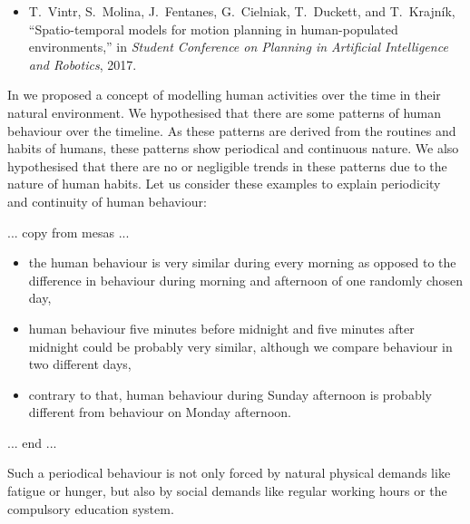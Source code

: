 \begin{itemize}
    \item T.~Vintr, S.~Molina, J.~Fentanes, G.~Cielniak, T.~Duckett, and T.~Krajn{\'i}k, ``Spatio-temporal models for motion planning in human-populated environments,'' in \emph{Student Conference on Planning in Artificial Intelligence and Robotics}, 2017.
\end{itemize}

In \cite{vintr2017spatiotemporal} we proposed a concept of modelling human activities over the time in their natural environment.
We hypothesised that there are some patterns of human behaviour over the timeline.
As these patterns are derived from the routines and habits of humans, these patterns show periodical and continuous nature.
We also hypothesised that there are no or negligible trends in these patterns due to the nature of human habits. 
Let us consider these examples to explain periodicity and continuity of human behaviour:

... copy from mesas ...
\begin{itemize}
    \item the human  behaviour is very similar during every morning as opposed to the difference in behaviour during morning and afternoon of one randomly chosen day,
    \item human behaviour five minutes before midnight and five minutes after midnight could be probably very similar, although we compare behaviour in two different days,
    \item contrary to that, human behaviour during Sunday afternoon is probably different from behaviour on Monday afternoon.
\end{itemize}
... end ...

Such a periodical behaviour is not only forced by natural physical demands like fatigue or hunger, but also by social demands like regular working hours or the compulsory education system. 

